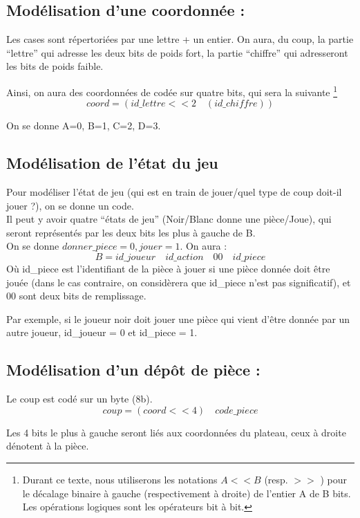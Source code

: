 \documentclass{article}
\begin{document}
\subsection{Mod\'elisation d'une coordonn\'ee :}

Les cases sont r\'epertori\'ees par une lettre + un entier. 
On aura, du coup, la partie ``lettre'' qui adresse les deux bits de
poids fort, la partie ``chiffre'' qui adresseront les bits de poids
faible.

Ainsi, on aura des coordonn\'ees de cod\'ee sur quatre bits, qui sera
la suivante \footnote{
  Durant ce texte, nous utiliserons les notations \( A << B \) (resp. \( >
  >\) )
  pour le d\'ecalage binaire \`a gauche (respectivement \`a droite) de l'entier A de B bits.
  Les op\'erations logiques sont les op\'erateurs bit \`a bit.
}
\[ coord = ( id\_lettre << 2  \quad (id\_chiffre) ) \] 

On se donne A=0, B=1, C=2, D=3.

\subsection{Mod\'elisation de l'\'etat du jeu}
Pour mod\'eliser l'\'etat de jeu (qui est en train de jouer/quel type de
coup doit-il jouer ?), on se donne un code. \\
Il peut y avoir quatre ``\'etats de jeu'' (Noir/Blanc  donne une
pi\`ece/Joue), qui seront repr\'esent\'es par les deux bits les plus \`a
gauche de B.\\
On se donne \( donner\_piece = 0, jouer = 1 \). On aura : 
\[ B = id\_joueur \quad  id\_action \quad 00 \quad id\_piece \]
O\`u id\_piece est l'identifiant de la pi\`ece \`a jouer si une pi\`ece
donn\'ee doit \^etre jou\'ee (dans le cas contraire, on consid\`erera que id\_piece n'est pas
significatif), et 00 sont deux bits de remplissage.

Par exemple, si le joueur noir doit jouer une pi\`ece qui vient
d'\^etre donn\'ee par un autre joueur, id\_joueur = 0 et id\_piece = 1.

\subsection{Mod\'elisation d'un d\'ep\^ot de pi\`ece :}
Le coup est cod\'e sur un byte (8b).
\[ coup =  (coord << 4) \quad code\_piece  \]

Les 4 bits le plus \`a gauche seront li\'es aux coordonn\'ees du
plateau, ceux \`a droite d\'enotent \`a la pi\`ece.
\end{document}
